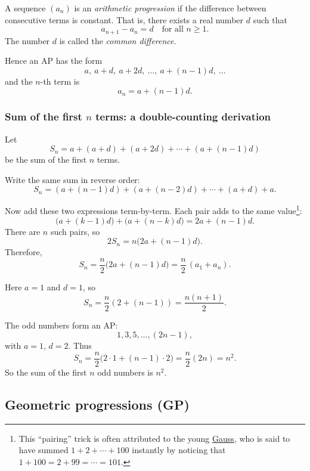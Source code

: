 \begin{definition}
A sequence $(a_n)$ is an \emph{arithmetic progression} if the difference between
consecutive terms is constant.  That is, there exists a real number $d$
such that
\[
a_{n+1}-a_n=d\quad\text{for all }n\ge 1.
\]
The number $d$ is called the \emph{common difference}.
\end{definition}

Hence an AP has the form
\[
a,\ a+d,\ a+2d,\ \dots,\ a+(n-1)d,\ \dots
\]
and the $n$-th term is
\[
a_n=a+(n-1)d.
\]

\subsubsection*{Sum of the first $n$ terms: a double-counting derivation}

Let
\[
S_n = a + (a+d) + (a+2d) + \cdots + (a+(n-1)d)
\]
be the sum of the first $n$ terms.

Write the same sum in reverse order:
\[
S_n = (a+(n-1)d) + (a+(n-2)d) + \cdots + (a+d) + a.
\]

Now add these two expressions term-by-term.  Each pair adds to the same value\footnote{This ``pairing'' trick is often attributed to the young \href{https://en.wikipedia.org/wiki/Carl_Friedrich_Gauss}{Gauss}, who is said
to have summed $1+2+\cdots+100$ instantly by noticing that $1+100=2+99=\cdots=101$.}:
\[
\bigl(a+(k-1)d\bigr) + \bigl(a+(n-k)d\bigr)=2a+(n-1)d.
\]
There are $n$ such pairs, so
\[
2S_n = n\bigl(2a+(n-1)d\bigr).
\]
Therefore,
\[
\boxed{\displaystyle
S_n = \frac{n}{2}\bigl(2a+(n-1)d\bigr)
     = \frac{n}{2}\,(a_1+a_n).
}
\]

\begin{example}
Here $a=1$ and $d=1$, so
\[
S_n=\frac{n}{2}(2+(n-1))=\frac{n(n+1)}{2}.
\]
\end{example}

\begin{example}
The odd numbers form an AP:
\[
1,3,5,\dots,(2n-1),
\]
with $a=1$, $d=2$. Thus
\[
S_n=\frac{n}{2}\bigl(2\cdot 1+(n-1)\cdot 2\bigr)
=\frac{n}{2}(2n)=n^2.
\]
So the sum of the first $n$ odd numbers is $n^2$.
\end{example}

\subsection{Geometric progressions (GP)}

